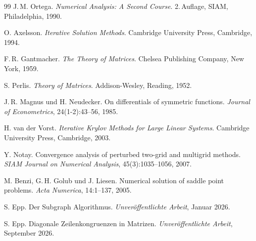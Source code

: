 \documentclass[a4paper,12pt]{article}
\theoremstyle{definition}
\begin{document}
\begin{thebibliography}{99}
J.\,M. Ortega. \textit{Numerical Analysis: A Second Course}. 2.\,Auflage, SIAM, Philadelphia, 1990.

O. Axelsson. \textit{Iterative Solution Methods}. Cambridge University Press, Cambridge, 1994.

F.\,R. Gantmacher. \textit{The Theory of Matrices}. Chelsea Publishing Company, New York, 1959.

S. Perlis. \textit{Theory of Matrices}. Addison-Wesley, Reading, 1952.

J.\,R. Magnus und H. Neudecker. On differentials of symmetric functions. \textit{Journal of Econometrics}, 24(1-2):43--56, 1985.

H. van der Vorst. \textit{Iterative Krylov Methods for Large Linear Systems}. Cambridge University Press, Cambridge, 2003.

Y. Notay. Convergence analysis of perturbed two-grid and multigrid methods. \textit{SIAM Journal on Numerical Analysis}, 45(3):1035--1056, 2007.

M. Benzi, G.\,H. Golub und J. Liesen. Numerical solution of saddle point problems. \textit{Acta Numerica}, 14:1--137, 2005.

S. Epp. Der Subgraph Algorithmus. \textit{Unveröffentlichte Arbeit}, Januar 2026.

S. Epp. Diagonale Zeilenkongruenzen in Matrizen. \textit{Unveröffentlichte Arbeit}, September 2026.

\end{thebibliography}
\end{document}
